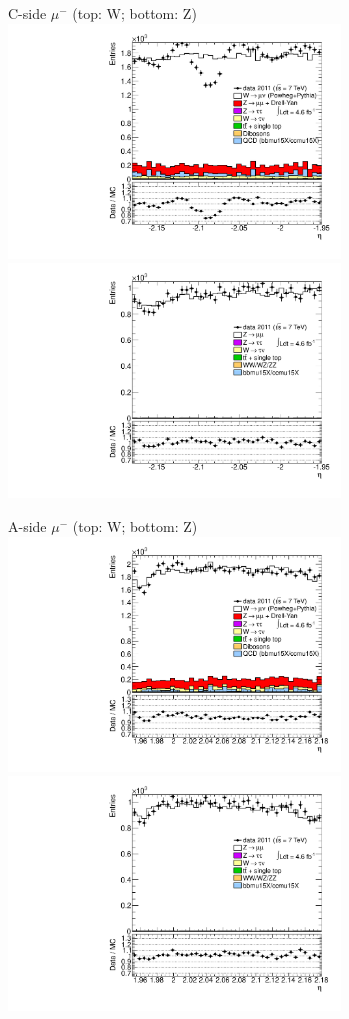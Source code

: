 {{
C-side $\mu^{-}$ (top: W; bottom: Z)
\centering
\includegraphics[width=0.66\textwidth]{dates/20130306/figures/etaphi/WpItoK_10_C_stack_l_eta_NEG} \\
\includegraphics[width=0.66\textwidth]{dates/20130306/figures/etaphi/Z_10_C_stack_lN_eta_ALL.pdf}

A-side $\mu^{-}$ (top: W; bottom: Z)
\centering
\includegraphics[width=0.66\textwidth]{dates/20130306/figures/etaphi/WpItoK_10_A_stack_l_eta_NEG} \\
\includegraphics[width=0.66\textwidth]{dates/20130306/figures/etaphi/Z_10_A_stack_lN_eta_ALL.pdf} 

}}
